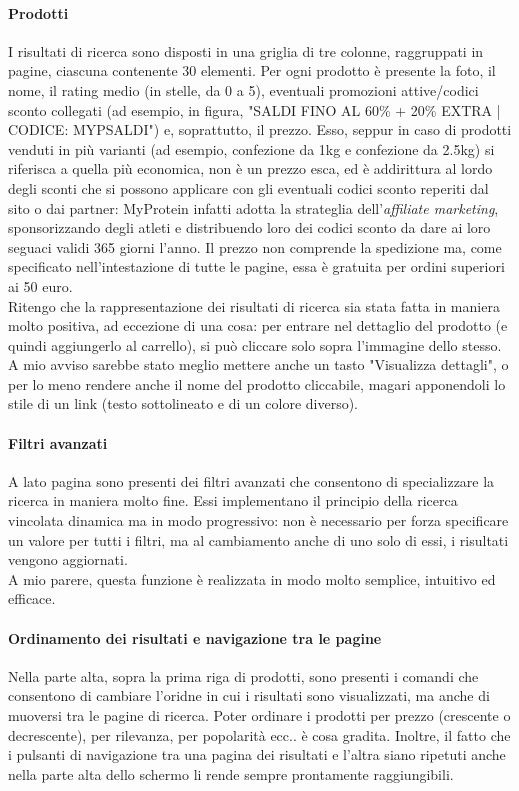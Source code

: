 \paragraph{Prodotti}
I risultati di ricerca sono disposti in una griglia di tre colonne, raggruppati in pagine, ciascuna contenente 30 elementi.
Per ogni prodotto è presente la foto, il nome, il rating medio (in stelle, da 0 a 5), eventuali promozioni attive/codici sconto collegati (ad esempio, in figura, "SALDI FINO AL 60\% + 20\% EXTRA | CODICE: MYPSALDI") e, soprattutto, il prezzo. Esso, seppur in caso di prodotti venduti in più varianti (ad esempio, confezione da 1kg e confezione da 2.5kg) si riferisca a quella più economica, non è un prezzo esca, ed è addirittura al lordo degli sconti che si possono applicare con gli eventuali codici sconto reperiti dal sito o dai partner: MyProtein infatti adotta la strateglia dell'\textit{affiliate marketing}, sponsorizzando degli atleti e distribuendo loro dei codici sconto da dare ai loro seguaci validi 365 giorni l'anno. Il prezzo non comprende la spedizione ma, come specificato nell'intestazione di tutte le pagine, essa è gratuita per ordini superiori ai 50 euro. \\
Ritengo che la rappresentazione dei risultati di ricerca sia stata fatta in maniera molto positiva, ad eccezione di una cosa: per entrare nel dettaglio del prodotto (e quindi aggiungerlo al carrello), si può cliccare solo sopra l'immagine dello stesso. A mio avviso sarebbe stato meglio mettere anche un tasto "Visualizza dettagli", o per lo meno rendere anche il nome del prodotto cliccabile, magari apponendoli lo stile di un link (testo sottolineato e di un colore diverso).

\paragraph{Filtri avanzati}
A lato pagina sono presenti dei filtri avanzati che consentono di specializzare la ricerca in maniera molto fine. Essi implementano il principio della ricerca vincolata dinamica ma in modo progressivo: non è necessario per forza specificare un valore per tutti i filtri, ma al cambiamento anche di uno solo di essi, i risultati vengono aggiornati.\\
A mio parere, questa funzione è realizzata in modo molto semplice, intuitivo ed efficace.

\paragraph{Ordinamento dei risultati e navigazione tra le pagine}
Nella parte alta, sopra la prima riga di prodotti, sono presenti i comandi che consentono di cambiare l'oridne in cui i risultati sono visualizzati, ma anche di muoversi tra le pagine di ricerca. Poter ordinare i prodotti per prezzo (crescente o decrescente), per rilevanza, per popolarità ecc.. è cosa gradita. Inoltre, il fatto che i pulsanti di navigazione tra una pagina dei risultati e l'altra siano ripetuti anche nella parte alta dello schermo li rende sempre prontamente raggiungibili.

